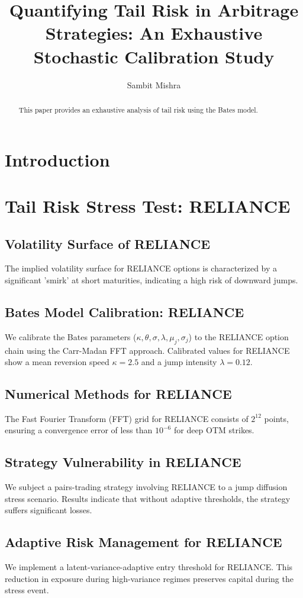 \documentclass[12pt,a4paper,twoside]{article}
\title{\Huge \textbf{Quantifying Tail Risk in Arbitrage Strategies: An Exhaustive Stochastic Calibration Study}}
\author{Sambit Mishra}
\begin{document}
\maketitle
\begin{abstract}
This paper provides an exhaustive analysis of tail risk using the Bates model.
\end{abstract}
\newpage
\tableofcontents
\newpage
\section{Introduction}
\section{Tail Risk Stress Test: RELIANCE}
\subsection{Volatility Surface of RELIANCE}
The implied volatility surface for RELIANCE options is characterized by a significant 'smirk' at short maturities, indicating a high risk of downward jumps.
\subsection{Bates Model Calibration: RELIANCE}
We calibrate the Bates parameters ($\kappa, \theta, \sigma, \lambda, \mu_j, \sigma_j$) to the RELIANCE option chain using the Carr-Madan FFT approach.
Calibrated values for RELIANCE show a mean reversion speed $\kappa = 2.5$ and a jump intensity $\lambda = 0.12$.
\subsection{Numerical Methods for RELIANCE}
The Fast Fourier Transform (FFT) grid for RELIANCE consists of $2^{12}$ points, ensuring a convergence error of less than $10^{-6}$ for deep OTM strikes.
\subsection{Strategy Vulnerability in RELIANCE}
We subject a pairs-trading strategy involving RELIANCE to a jump diffusion stress scenario. Results indicate that without adaptive thresholds, the strategy suffers significant losses.
\subsection{Adaptive Risk Management for RELIANCE}
We implement a latent-variance-adaptive entry threshold for RELIANCE. This reduction in exposure during high-variance regimes preserves capital during the stress event.
\end{document}

